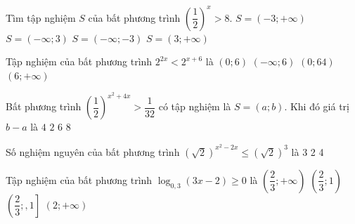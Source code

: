 \begin{ex}%
	Tìm tập nghiệm $S$ của bất phương trình $\left( \dfrac{1}{2}\right) ^x>8$.
	\choice
	{$S=\left( -3;+\infty\right) $}
	{$S=\left( -\infty;3\right) $}
	{\True $S=\left( -\infty;-3\right) $}
	{$S=\left( 3;+\infty\right) $}
\end{ex}

\begin{ex}%
	Tập nghiệm của bất phương trình $2^{2x}< 2^{x + 6}$ là
	\choice
	{$(0;6)$}
	{\True $( - \infty ; 6)$}
	{$( 0 ; 64 )$}
	{$(6 ; + \infty)$}
	
\end{ex}

\begin{ex}%
	Bất phương trình $\left(\dfrac{1}{2}\right)^{x^2+4x}>\dfrac{1}{32}$ có tập nghiệm là $S=(a;b)$. Khi đó giá trị $b-a$ là
	\choice
	{$4$}
	{$2$}
	{\True $6$}
	{$8$}
\end{ex}

\begin{ex}%
	Số nghiệm nguyên của bất phương trình ${\left(\sqrt{2}\right)}^{x^2-2x}\leqslant {\left(\sqrt{2}\right)}^3$ là
	\choice
	{3}
	{2}
	{}
	{4}
\end{ex}

\begin{ex}%
	Tập nghiệm của bất phương trình $\log _{0,3}(3x-2)\geq 0$ là
	\choice
	{$\left(\dfrac{2}{3};+\infty\right)$}
	{$\left(\dfrac{2}{3}; 1\right)$}
	{\True $\left(\dfrac{2}{3};,1\right]$}
	{$(2;+\infty)$}
	\loigiai{
		Ta có:
		$\log _{0,3}(3x-2)\geq 0 \Leftrightarrow \heva{& 3x-2>0\\&3x-2\leq 1}\Leftrightarrow \heva{& x>\dfrac{2}{3}\\&x\leq 1}\Leftrightarrow \dfrac{2}{3}<x\leq 1$.\\
		Tập nghiệm của bất phương trình là $\left(\dfrac{2}{3}; 1\right]$.}
\end{ex}

